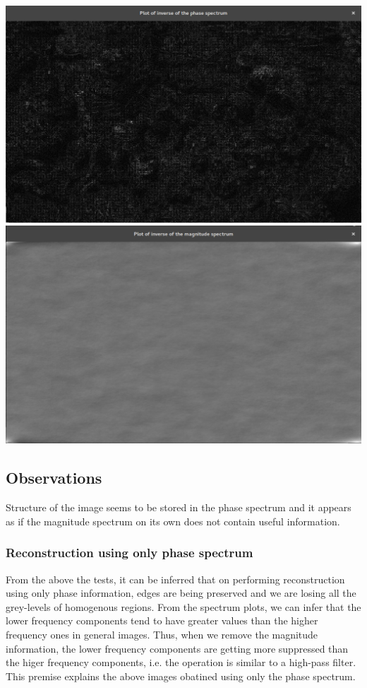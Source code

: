 \documentclass[a4paper,fleqn,11pt]{article}
\theoremstyle{mytheor}
\begin{document}
\begin{center}
\includegraphics[scale= 0.29]{../results/low_phase.png}
\includegraphics[scale= 0.29]{../results/low_magnitude.png}
\end{center}
\subsection*{Observations}
Structure of the image seems to be stored in the phase spectrum and it appears as if the magnitude spectrum on its own does not contain useful information.
\subsubsection*{Reconstruction using only phase spectrum}
From the above the tests, it can be inferred that on performing reconstruction using only phase information, edges are being preserved and we are losing all the grey-levels of homogenous regions. From the spectrum plots, we can infer that the lower frequency components tend to have greater values than the higher frequency ones in general images. Thus, when we remove the magnitude information, the lower frequency components are getting more suppressed than the higer frequency components, i.e. the operation is similar to a high-pass filter. This premise explains the above images obatined using only the phase spectrum.
\end{document}
